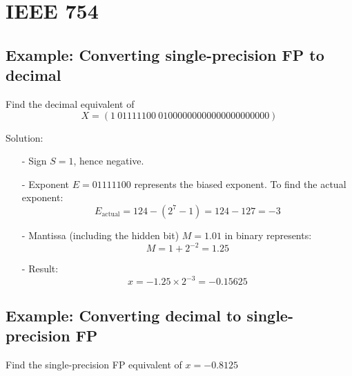 \documentclass[12pt,openany]{book}
\begin{document}
			      	\section*{IEEE 754}
			      	\subsection*{Example: Converting single-precision FP to decimal}
			      	
			      	Find the decimal equivalent of
			      	\[ X = (1\ 01111100\ 01000000000000000000000) \]
			      	
			      	Solution:
			      	\begin{itemize}
			      		\item[-] Sign \( S = 1 \), hence negative.
			      		\item[-] Exponent \( E = 01111100 \) represents the biased exponent. To find the actual exponent:
			      		      \[ E_{\text{actual}} = 124 - (2^7 - 1) = 124 - 127 = -3 \]
			      		\item[-] Mantissa (including the hidden bit) \( M = 1.01 \) in binary represents:
			      		      \[ M = 1 + 2^{-2} = 1.25 \]
			      		\item[-] Result:
			      		      \[ x = -1.25 \times 2^{-3} = -0.15625 \]
			      	\end{itemize}
			      	
			      	\subsection*{Example: Converting decimal to single-precision FP}
			      	
			      	Find the single-precision FP equivalent of \( x = -0.8125 \)
			      	
\end{document}
